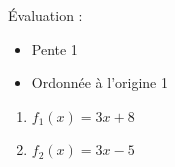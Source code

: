 %
%
    Évaluation :
    \begin{itemize}
        \item Pente \hfill 1
        \item Ordonnée à l'origine \hfill 1
    \end{itemize}
    \begin{enumerate}[cols=3]
        \item $f_1(x) = 3x + 8$
        \item $f_2(x) = 3x - 5$
    \end{enumerate}

